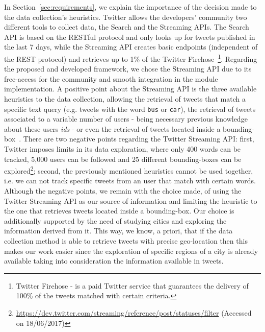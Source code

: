 In Section~\ref{sec:requirements}, we explain the importance of the decision made to the data collection's heuristics. Twitter allows the developers' community two different tools to collect data, the Search and the Streaming APIs. The Search API is based on the RESTful protocol and only looks up for tweets published in the last 7 days, while the Streaming API creates basic endpoints (independent of the REST protocol) and retrieves up to 1\% of the Twitter Firehose~\footnote{Twitter Firehose - is a paid Twitter service that guarantees the delivery of 100\% of the tweets matched with certain criteria.}. Regarding the proposed and developed framework, we chose the Streaming API due to its free-access for the community and smooth integration in the module implementation. A positive point about the Streaming API is the three available heuristics to the data collection, allowing the retrieval of tweets that match a specific text query (e.g. tweets with the word \texttt{bus} or \texttt{car}), the retrieval of tweets associated to a variable  number of users - being necessary previous knowledge about these users \textit{ids} - or even the retrieval of tweets located inside a bounding-box~\cite{mac2016effects}. There are two negative points regarding the Twitter Streaming API: first, Twitter imposes limits in its data exploration, where only 400 words can be tracked, 5,000 users can be followed and 25 different bounding-boxes can be explored\footnote{\url{https://dev.twitter.com/streaming/reference/post/statuses/filter} (Accessed on 18/06/2017)}; second, the previously mentioned heuristics cannot be used together, i.e. we can not track specific tweets from an user that match with certain words. Although the negative points, we remain with the choice made, of using the Twitter Streaming API as our source of information and limiting the heuristic to the one that retrieves tweets located inside a bounding-box. Our choice is additionally supported by the need of studying cities and exploring the information derived from it. This way, we know, a priori, that if the data collection method is able to retrieve tweets with precise geo-location then this makes our work easier since the exploration of specific regions of a city is already available taking into consideration the information available in tweets.

